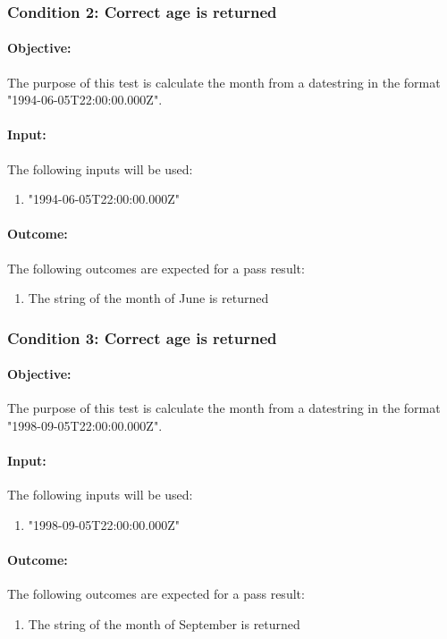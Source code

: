 \documentclass{article}
\begin{document}
\subsubsection{Condition 2: Correct age is returned  }
\paragraph{Objective:}  The purpose of this test is calculate the month from a datestring in the format "1994-06-05T22:00:00.000Z".
\paragraph{Input:} The following inputs will be used:
\begin{enumerate}
	\item "1994-06-05T22:00:00.000Z"
\end{enumerate}
\paragraph{Outcome:} The following outcomes are expected for a pass result:
\begin{enumerate}
	\item The string of the month of June is returned
\end{enumerate}
\subsubsection{Condition 3: Correct age is returned  }
\paragraph{Objective:}  The purpose of this test is calculate the month from a datestring in the format "1998-09-05T22:00:00.000Z".
\paragraph{Input:} The following inputs will be used:
\begin{enumerate}
	\item "1998-09-05T22:00:00.000Z"
\end{enumerate}
\paragraph{Outcome:} The following outcomes are expected for a pass result:
\begin{enumerate}
	\item The string of the month of September is returned
\end{enumerate}
\end{document}
